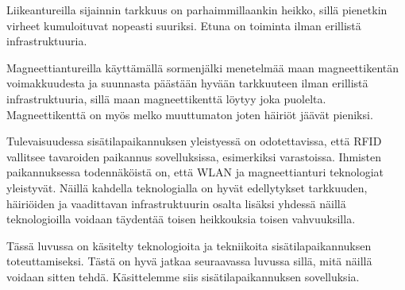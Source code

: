 Liikeantureilla sijainnin tarkkuus on parhaimmillaankin heikko, sillä pienetkin virheet kumuloituvat nopeasti suuriksi. Etuna on toiminta ilman erillistä infrastruktuuria.

Magneettiantureilla käyttämällä sormenjälki menetelmää maan magneettikentän voimakkuudesta ja suunnasta päästään hyvään tarkkuuteen ilman erillistä infrastruktuuria, sillä maan magneettikenttä löytyy joka puolelta. Magneettikenttä on myös melko muuttumaton joten häiriöt jäävät pieniksi. 

Tulevaisuudessa sisätilapaikannuksen yleistyessä on odotettavissa, että RFID vallitsee tavaroiden paikannus sovelluksissa, esimerkiksi varastoissa. Ihmisten paikannuksessa todennäköistä on, että WLAN ja magneettianturi teknologiat yleistyvät. Näillä kahdella teknologialla on hyvät edellytykset tarkkuuden, häiriöiden ja vaadittavan infrastruktuurin osalta lisäksi yhdessä näillä teknologioilla voidaan täydentää toisen heikkouksia toisen vahvuuksilla.

Tässä luvussa on käsitelty teknologioita ja tekniikoita sisätilapaikannuksen toteuttamiseksi. Tästä on hyvä jatkaa seuraavassa luvussa sillä, mitä näillä voidaan sitten tehdä. Käsittelemme siis sisätilapaikannuksen sovelluksia.


